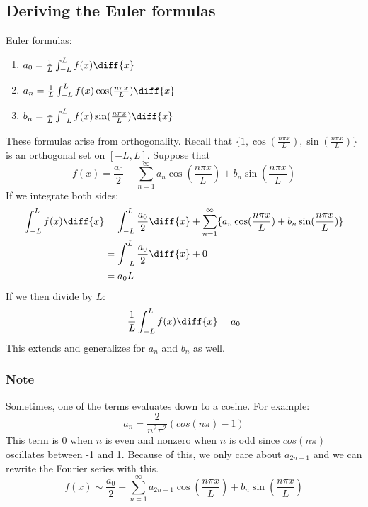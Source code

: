 \documentclass{math}
\begin{document}
\subsection*{Deriving the Euler formulas}
Euler formulas:
\begin{enumerate}
  \item \( a_0 = \frac{1}{L}\int_{-L}^{L}f(x)\diff{x} \)
  \item \( a_n = \frac{1}{L}\int_{-L}^{L}f(x)\cos(\frac{n\pi x}{L})\diff{x} \)
  \item \( b_n = \frac{1}{L}\int_{-L}^{L}f(x)\sin(\frac{n\pi x}{L})\diff{x} \)
\end{enumerate}
These formulas arise from orthogonality. Recall that \( \{1,
\cos(\frac{n\pi x}{L}),\sin(\frac{n\pi x}{L}) \} \) is an orthogonal set on
\( [-L,L] \). Suppose that
\[ f(x) = \frac{a_0}{2}+\sum_{n=1}^{\infty}a_n\cos(\frac{n\pi x}{L})+
  b_n\sin(\frac{n\pi x}{L}) \]
If we integrate both sides:
\begin{align*}
  \int_{-L}^{L}f(x)\diff{x} &= \int_{-L}^{L}\frac{a_0}{2}\diff{x}+
    \sum_{n=1}^{\infty}\{a_n\cos(\frac{n\pi x}{L})+
    b_n\sin(\frac{n\pi x}{L})\} \\
  &= \int_{-L}^{L}\frac{a_0}{2}\diff{x}+0 \\
  &= a_0L
\end{align*}
If we then divide by \( L \):
\[ \frac{1}{L}\int_{-L}^{L}f(x)\diff{x} = a_0 \]
This extends and generalizes for \( a_n \) and \( b_n \) as well.

\subsubsection*{Note}
Sometimes, one of the terms evaluates down to a cosine. For example:
\[ a_n = \frac{2}{n^2\pi^2}(cos(n\pi)-1) \]
This term is 0 when \( n \) is even and nonzero when \( n \) is odd since
\( cos(n\pi) \) oscillates between -1 and 1. Because of this, we only care about
\( a_{2n-1} \) and we can rewrite the Fourier series with this.
\[ f(x) \sim \frac{a_0}{2}+\sum_{n=1}^{\infty}a_{2n-1}\cos(\frac{n\pi x}{L})+
  b_n\sin(\frac{n\pi x}{L}) \]
\end{document}
